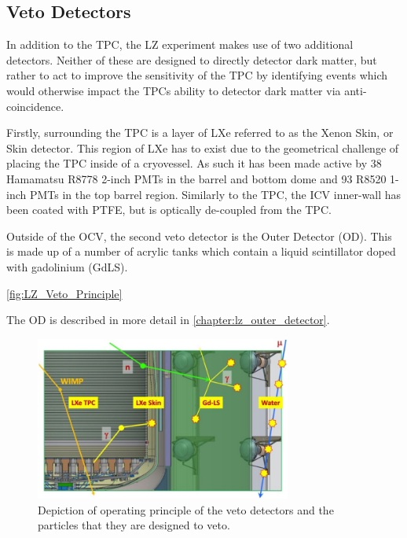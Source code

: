 \subsection{Veto Detectors}
\label{sec:lz_veto_detectors}
\par
In addition to the TPC, the LZ experiment makes use of two additional detectors.
Neither of these are designed to directly detector dark matter, but rather to act to improve the sensitivity of the TPC by identifying events which would otherwise impact the TPCs ability to detector dark matter via anti-coincidence.

\par
Firstly, surrounding the TPC is a layer of LXe referred to as the Xenon Skin, or Skin detector.
This region of LXe has to exist due to the geometrical challenge of placing the TPC inside of a cryovessel.
As such it has been made active by 38 Hamamatsu R8778 2-inch PMTs in the barrel and bottom dome and 93 R8520 1-inch PMTs in the top barrel region.
Similarly to the TPC, the ICV inner-wall has been coated with PTFE, but is optically de-coupled from the TPC.

\par
Outside of the OCV, the second veto detector is the Outer Detector (OD).
This is made up of a number of acrylic tanks which contain a liquid scintillator doped with gadolinium (GdLS).



\autoref{fig:LZ_Veto_Principle}

The OD is described in more detail in \autoref{chapter:lz_outer_detector}.

\begin{figure}
    \centering
    \includegraphics[width=0.75\textwidth]{Figures/LZ/lz_veto_plan.png}
    \caption{Depiction of operating principle of the veto detectors and the particles that they are designed to veto.}
    \label{fig:LZ_Veto_Principle}
\end{figure}


